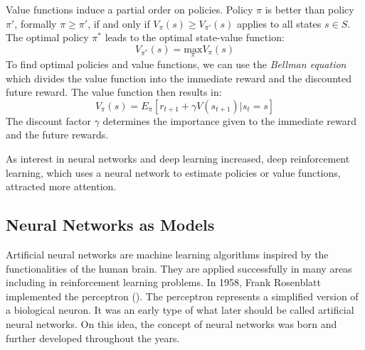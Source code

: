 Value functions induce a partial order on policies. Policy $\pi$ is better than policy $\pi'$, formally $\pi \geq \pi'$, if and only if $V_\pi(s) \geq V_{\pi'}(s)$ applies to all states $s \in S$. The optimal policy $\pi^*$ leads to the optimal state-value function:
\begin{equation*}
  V_{\pi^*}(s) = \underset{\pi}{\text{max}} V_\pi(s)
\end{equation*}
To find optimal policies and value functions, we can use the \textit{Bellman equation} which divides the value function into the immediate reward and the discounted future reward. The value function then results in:
\begin{equation*}
  V_\pi(s) = E_\pi [r_{t+1} + \gamma V(s_{t+1}) | s_t = s]
\end{equation*}
The discount factor $\gamma$ determines the importance given to the immediate reward and the future rewards.



As interest in neural networks and deep learning increased, deep reinforcement learning, which uses a neural network to estimate policies or value functions, attracted more attention.


\subsection{Neural Networks as Models}
\label{subsec:NN}
Artificial neural networks are machine learning algorithms inspired by the functionalities of the human brain. They are applied successfully in many areas including in reinforcement learning problems. In 1958, Frank Rosenblatt implemented the perceptron (\cite{rosenblatt1958perceptron}). The perceptron represents a simplified version of a biological neuron. It was an early type of what later should be called artificial neural networks. On this idea, the concept of neural networks was born and further developed throughout the years.

